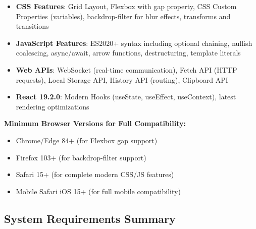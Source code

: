 \documentclass[12pt]{article}
\begin{document}
\begin{itemize}
\item \textbf{CSS Features}: Grid Layout, Flexbox with gap property, CSS Custom Properties (variables), backdrop-filter for blur effects, transforms and transitions
\item \textbf{JavaScript Features}: ES2020+ syntax including optional chaining, nullish coalescing, async/await, arrow functions, destructuring, template literals
\item \textbf{Web APIs}: WebSocket (real-time communication), Fetch API (HTTP requests), Local Storage API, History API (routing), Clipboard API
\item \textbf{React 19.2.0}: Modern Hooks (useState, useEffect, useContext), latest rendering optimizations
\end{itemize}

\textbf{Minimum Browser Versions for Full Compatibility:}
\begin{itemize}
\item Chrome/Edge 84+ (for Flexbox gap support)
\item Firefox 103+ (for backdrop-filter support)
\item Safari 15+ (for complete modern CSS/JS features)
\item Mobile Safari iOS 15+ (for full mobile compatibility)
\end{itemize}

\subsection{System Requirements Summary}
\end{document}
